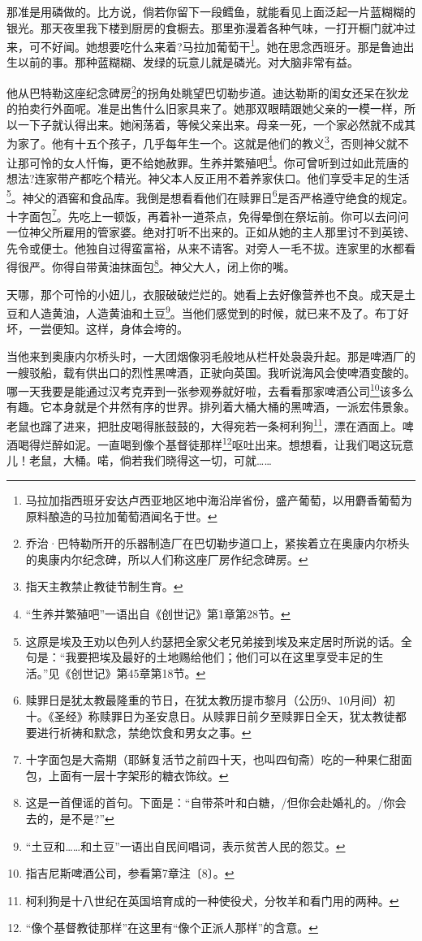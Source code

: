 \par 那准是用磷做的。比方说，倘若你留下一段鳕鱼，就能看见上面泛起一片蓝糊糊的银光。那天夜里我下楼到厨房的食橱去。那里弥漫着各种气味，一打开橱门就冲过来，可不好闻。她想要吃什么来着?马拉加葡萄干\footnote{马拉加指西班牙安达卢西亚地区地中海沿岸省份，盛产葡萄，以用麝香葡萄为原料酿造的马拉加葡萄酒闻名于世。}。她在思念西班牙。那是鲁迪出生以前的事。那种蓝糊糊、发绿的玩意儿就是磷光。对大脑非常有益。
\par 他从巴特勒这座纪念碑房\footnote{乔治·巴特勒所开的乐器制造厂在巴切勒步道口上，紧挨着立在奥康内尔桥头的奥康内尔纪念碑，所以人们称这座厂房作纪念碑房。}的拐角处眺望巴切勒步道。迪达勒斯的闺女还呆在狄龙的拍卖行外面呢。准是出售什么旧家具来了。她那双眼睛跟她父亲的一模一样，所以一下子就认得出来。她闲荡着，等候父亲出来。母亲一死，一个家必然就不成其为家了。他有十五个孩子，几乎每年生一个。这就是他们的教义\footnote{指天主教禁止教徒节制生育。}，否则神父就不让那可怜的女人忏悔，更不给她赦罪。生养并繁殖吧\footnote{“生养并繁殖吧”一语出自《创世记》第1章第28节。}。你可曾听到过如此荒唐的想法?连家带产都吃个精光。神父本人反正用不着养家伕口。他们享受丰足的生活\footnote{这原是埃及王劝以色列人约瑟把全家父老兄弟接到埃及来定居时所说的话。全句是：“我要把埃及最好的土地赐给他们；他们可以在这里享受丰足的生活。”见《创世记》第45章第18节。}。神父的酒窖和食品库。我倒是想看看他们在赎罪日\footnote{赎罪日是犹太教最隆重的节日，在犹太教历提市黎月（公历9、10月间）初十。《圣经》称赎罪日为圣安息日。从赎罪日前夕至赎罪日全天，犹太教徒都要进行祈祷和默念，禁绝饮食和男女之事。}是否严格遵守绝食的规定。十字面包\footnote{十字面包是大斋期（耶稣复活节之前四十天，也叫四旬斋）吃的一种果仁甜面包，上面有一层十字架形的糖衣饰纹。}。先吃上一顿饭，再着补一道茶点，免得晕倒在祭坛前。你可以去问问一位神父所雇用的管家婆。绝对打听不出来的。正如从她的主人那里讨不到英镑、先令或便士。他独自过得蛮富裕，从来不请客。对旁人一毛不拔。连家里的水都看得很严。你得自带黄油抹面包\footnote{这是一首俚谣的首句。下面是：“自带茶叶和白糖，/但你会赴婚礼的。/你会去的，是不是?”}。神父大人，闭上你的嘴。
\par 天哪，那个可怜的小妞儿，衣服破破烂烂的。她看上去好像营养也不良。成天是土豆和人造黄油，人造黄油和土豆\footnote{“土豆和……和土豆”一语出自民间唱词，表示贫苦人民的怨艾。}。当他们感觉到的时候，就已来不及了。布丁好坏，一尝便知。这样，身体会垮的。
\par 当他来到奥康内尔桥头时，一大团烟像羽毛般地从栏杆处袅袅升起。那是啤酒厂的一艘驳船，载有供出口的烈性黑啤酒，正驶向英国。我听说海风会使啤酒变酸的。哪一天我要是能通过汉考克弄到一张参观券就好啦，去看看那家啤酒公司\footnote{指吉尼斯啤酒公司，参看第7章注〔8〕。}该多么有趣。它本身就是个井然有序的世界。排列着大桶大桶的黑啤酒，一派宏伟景象。老鼠也蹿了进来，把肚皮喝得胀鼓鼓的，大得宛若一条柯利狗\footnote{柯利狗是十八世纪在英国培育成的一种使役犬，分牧羊和看门用的两种。}，漂在酒面上。啤酒喝得烂醉如泥。一直喝到像个基督徒那样\footnote{“像个基督教徒那样”在这里有“像个正派人那样”的含意。}呕吐出来。想想看，让我们喝这玩意儿！老鼠，大桶。喏，倘若我们晓得这一切，可就……
